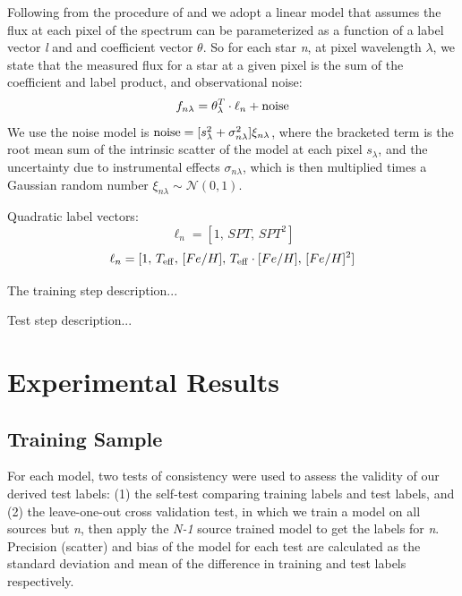 \documentclass[modern]{aastex62}
\begin{document}
Following from the procedure of \citealt{Ness:2015} and \citealt{Ho:2017a} we adopt a linear model that assumes the flux at each pixel of the spectrum can be parameterized as a function of a label vector \emph{l} and and coefficient vector \emph{$\theta$}. So for each star \emph{n}, at pixel wavelength \emph{$\lambda$}, we state that the measured flux for a star at a given pixel is the sum of the coefficient and label product, and observational noise:
\begin{equation}
	f_{n\lambda} = \theta_{\lambda}^{T} \cdot \ell_{n} + {\rm noise}
\end{equation}
We use the noise model is ${\rm noise}=[s_{\lambda}^2 + \sigma_{n\lambda}^2]\xi_{n\lambda}$, where the bracketed term is the root mean sum of the intrinsic scatter of the model at each pixel \emph{$s_{\lambda}$}, and the uncertainty due to instrumental effects \emph{$\sigma_{n\lambda}$}, which is then multiplied times a Gaussian random number $\xi_{n\lambda} \sim \mathcal{N} (0,1)$. 

Quadratic label vectors:
	\[\ell_{n} = [1, \, SPT, \, SPT^{2}] \]
	\[\ell_{n} = [1, \, T_{\rm eff}, \, [Fe/H], \, T_{\rm eff} \cdot [Fe/H], \, [Fe/H]^{2}] \]

The training step description...

Test step description...


\section{Experimental Results} \label{sec:results}

\subsection{Training Sample}

For each model, two tests of consistency were used to assess the validity of our derived test labels: (1) the self-test comparing training labels and test labels, and (2) the leave-one-out cross validation test, in which we train a model on all sources but \emph{n}, then apply the \emph{N-1} source trained model to get the labels for \emph{n}. Precision (scatter) and bias of the model for each test are calculated as the standard deviation and mean of the difference in training and test labels respectively.
\end{document}
